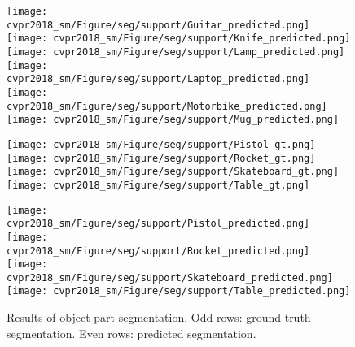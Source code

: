 \documentclass[10pt,twocolumn,letterpaper]{article}
\begin{document}
\begin{figure*}[t]
        \texttt{[image: cvpr2018\_sm/Figure/seg/support/Guitar\_predicted.png]} \hspace{10pt}
        \texttt{[image: cvpr2018\_sm/Figure/seg/support/Knife\_predicted.png]} \hspace{10pt}
        \texttt{[image: cvpr2018\_sm/Figure/seg/support/Lamp\_predicted.png]} \hspace{10pt}
        \texttt{[image: cvpr2018\_sm/Figure/seg/support/Laptop\_predicted.png]} \hspace{10pt}
        \texttt{[image: cvpr2018\_sm/Figure/seg/support/Motorbike\_predicted.png]} \hspace{10pt}
        \texttt{[image: cvpr2018\_sm/Figure/seg/support/Mug\_predicted.png]}
        
        \vspace{15pt}
        
        \texttt{[image: cvpr2018\_sm/Figure/seg/support/Pistol\_gt.png]} \hspace{10pt}
        \texttt{[image: cvpr2018\_sm/Figure/seg/support/Rocket\_gt.png]} \hspace{10pt}
        \texttt{[image: cvpr2018\_sm/Figure/seg/support/Skateboard\_gt.png]} \hspace{10pt}
        \texttt{[image: cvpr2018\_sm/Figure/seg/support/Table\_gt.png]}
    
        \texttt{[image: cvpr2018\_sm/Figure/seg/support/Pistol\_predicted.png]} \hspace{10pt}
        \texttt{[image: cvpr2018\_sm/Figure/seg/support/Rocket\_predicted.png]} \hspace{10pt}
        \texttt{[image: cvpr2018\_sm/Figure/seg/support/Skateboard\_predicted.png]} \hspace{10pt}
        \texttt{[image: cvpr2018\_sm/Figure/seg/support/Table\_predicted.png]}
        
        \caption{Results of object part segmentation. Odd rows: ground truth segmentation. Even rows: predicted segmentation.}
        \label{fig_seg_results}

\end{figure*}





 
\end{document}
